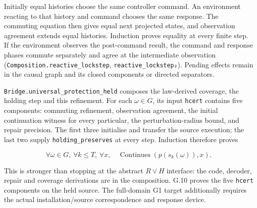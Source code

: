 \documentclass[
]{article}
\begin{document}
Initially equal histories choose the same controller command. An
environment reacting to that history and command chooses the same
response. The commuting equation then gives equal next projected states,
and observation agreement extends equal histories. Induction proves
equality at every finite step. If the environment observes the
post-command result, the command and response phases commute separately
and agree at the intermediate observation
(\texttt{C\allowbreak{}o\allowbreak{}m\allowbreak{}p\allowbreak{}o\allowbreak{}s\allowbreak{}i\allowbreak{}t\allowbreak{}i\allowbreak{}o\allowbreak{}n\allowbreak{}.\allowbreak{}r\allowbreak{}e\allowbreak{}a\allowbreak{}c\allowbreak{}t\allowbreak{}i\allowbreak{}v\allowbreak{}e\allowbreak{}\_\allowbreak{}l\allowbreak{}o\allowbreak{}c\allowbreak{}k\allowbreak{}s\allowbreak{}t\allowbreak{}e\allowbreak{}p},
\texttt{r\allowbreak{}e\allowbreak{}a\allowbreak{}c\allowbreak{}t\allowbreak{}i\allowbreak{}v\allowbreak{}e\allowbreak{}\_\allowbreak{}l\allowbreak{}o\allowbreak{}c\allowbreak{}k\allowbreak{}s\allowbreak{}t\allowbreak{}e\allowbreak{}p\allowbreak{}₂}).
Pending effects remain in the causal graph and its closed components or
directed separators.

\texttt{B\allowbreak{}r\allowbreak{}i\allowbreak{}d\allowbreak{}g\allowbreak{}e\allowbreak{}.\allowbreak{}u\allowbreak{}n\allowbreak{}i\allowbreak{}v\allowbreak{}e\allowbreak{}r\allowbreak{}s\allowbreak{}a\allowbreak{}l\allowbreak{}\_\allowbreak{}p\allowbreak{}r\allowbreak{}o\allowbreak{}t\allowbreak{}e\allowbreak{}c\allowbreak{}t\allowbreak{}i\allowbreak{}o\allowbreak{}n\allowbreak{}\_\allowbreak{}h\allowbreak{}e\allowbreak{}l\allowbreak{}d}
composes the law-derived coverage, the holding step and this refinement.
For each \(\omega\in G\), its input \texttt{hcert} contains five
components: commuting refinement, observation agreement, the initial
continuation witness for every particular, the perturbation-radius
bound, and repair precision. The first three initialise and transfer the
source execution; the last two supply
\texttt{h\allowbreak{}o\allowbreak{}l\allowbreak{}d\allowbreak{}i\allowbreak{}n\allowbreak{}g\allowbreak{}\_\allowbreak{}p\allowbreak{}r\allowbreak{}e\allowbreak{}s\allowbreak{}e\allowbreak{}r\allowbreak{}v\allowbreak{}e\allowbreak{}s}
at every step. Induction therefore proves

\[
\forall\omega\in G,\ \forall k\le T,\ \forall x,
\quad\operatorname{Continues}(p(s_k(\omega)),x).
\]

This is stronger than stopping at the abstract \(R\lor H\) interface:
the code, decoder, repair and coverage derivations are in the
composition. G.10 proves the five \texttt{hcert} components on the held
source. The full-domain G1 target additionally requires the actual
i\allowbreak{}n\allowbreak{}s\allowbreak{}t\allowbreak{}a\allowbreak{}l\allowbreak{}l\allowbreak{}a\allowbreak{}t\allowbreak{}i\allowbreak{}o\allowbreak{}n\allowbreak{}/\allowbreak{}s\allowbreak{}o\allowbreak{}u\allowbreak{}r\allowbreak{}c\allowbreak{}e
correspondence and response device.
\end{document}
